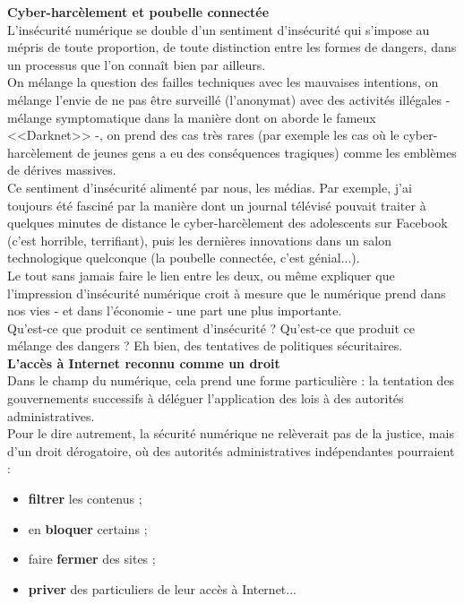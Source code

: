 \documentclass[11pt,twoside,a4paper]{article}
\begin{document}
\textbf{\large Cyber-harc{\`e}lement et poubelle connect{\'e}e}~\\

L'ins{\'e}curit{\'e} num{\'e}rique se double d'un sentiment d'ins{\'e}curit{\'e} qui s'impose au m{\'e}pris de toute proportion, de toute distinction entre les formes de dangers, dans un processus que l'on conna{\^i}t bien par ailleurs. ~\\

On m{\'e}lange la question des failles techniques avec les mauvaises intentions, on m{\'e}lange l'envie de ne pas {\^e}tre surveill{\'e} (l'anonymat) avec des activit{\'e}s ill{\'e}gales - m{\'e}lange symptomatique dans la mani{\`e}re dont on aborde le fameux <<Darknet>> -, on prend des cas tr{\`e}s rares (par exemple les cas o{\`u} le cyber-harc{\`e}lement de jeunes gens a eu des cons{\'e}quences tragiques) comme les embl{\`e}mes de d{\'e}rives massives. ~\\

Ce sentiment d'ins{\'e}curit{\'e} aliment{\'e} par nous, les m{\'e}dias. Par exemple, j'ai toujours {\'e}t{\'e} fascin{\'e} par la mani{\`e}re dont un journal t{\'e}l{\'e}vis{\'e} pouvait traiter {\`a} quelques minutes de distance le cyber-harc{\`e}lement des adolescents sur Facebook (c'est horrible, terrifiant), puis les derni{\`e}res innovations dans un salon technologique quelconque (la poubelle connect{\'e}e, c'est g{\'e}nial...). ~\\

Le tout sans jamais faire le lien entre les deux, ou m{\^e}me expliquer que l'impression d'ins{\'e}curit{\'e} num{\'e}rique croit {\`a} mesure que le num{\'e}rique prend dans nos vies - et dans l'{\'e}conomie - une part une plus importante. ~\\

Qu'est-ce que produit ce sentiment d'ins{\'e}curit{\'e} ? Qu'est-ce que produit ce m{\'e}lange des dangers ? Eh bien, des tentatives de politiques s{\'e}curitaires. ~\\

\textbf{\large L'acc{\`e}s {\`a} Internet reconnu comme un droit}~\\

Dans le champ du num{\'e}rique, cela prend une forme particuli{\`e}re : la tentation des gouvernements successifs {\`a} d{\'e}l{\'e}guer l'application des lois {\`a} des autorit{\'e}s administratives. ~\\

Pour le dire autrement, la s{\'e}curit{\'e} num{\'e}rique ne rel{\`e}verait pas de la justice, mais d'un droit d{\'e}rogatoire, o{\`u} des autorit{\'e}s administratives ind{\'e}pendantes pourraient :
\begin{itemize}
	\item \textbf{filtrer} les contenus ;
	\item en \textbf{bloquer} certains ;
	\item faire \textbf{fermer} des sites ;
	\item \textbf{priver} des particuliers de leur acc{\`e}s {\`a} Internet...
\end{itemize}
\end{document}
